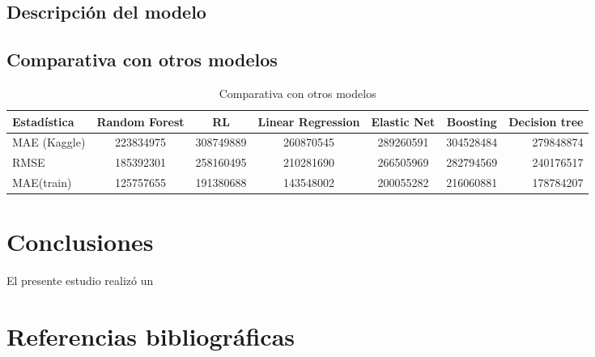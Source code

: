 \documentclass[
  11pt,
  letterpaper,
]{article}
\begin{document}
\hypertarget{descripciuxf3n-del-modelo}{%
\subsection{Descripción del modelo}\label{descripciuxf3n-del-modelo}}

\hypertarget{comparativa-con-otros-modelos}{%
\subsection{Comparativa con otros modelos}\label{comparativa-con-otros-modelos}}

\begin{table}[ht]
\centering
\caption{Comparativa con otros modelos}
\begin{tabular}{lcccccr}
\hline \hline
Estadística & Random Forest & RL & Linear Regression & Elastic Net & Boosting & Decision tree \\
\hline
MAE (Kaggle) & 223834975 & 308749889 & 260870545 & 289260591 & 304528484 & 279848874 \\
RMSE & 185392301 & 258160495 & 210281690 & 266505969 & 282794569 & 240176517 \\
MAE(train) & 125757655 & 191380688 & 143548002 & 200055282 & 216060881 & 178784207 \\
\hline
\end{tabular}
\end{table}

\hypertarget{conclusiones}{%
\section{Conclusiones}\label{conclusiones}}

El presente estudio realizó un

\hypertarget{referencias-bibliogruxe1ficas}{%
\section{Referencias bibliográficas}\label{referencias-bibliogruxe1ficas}}
\end{document}

